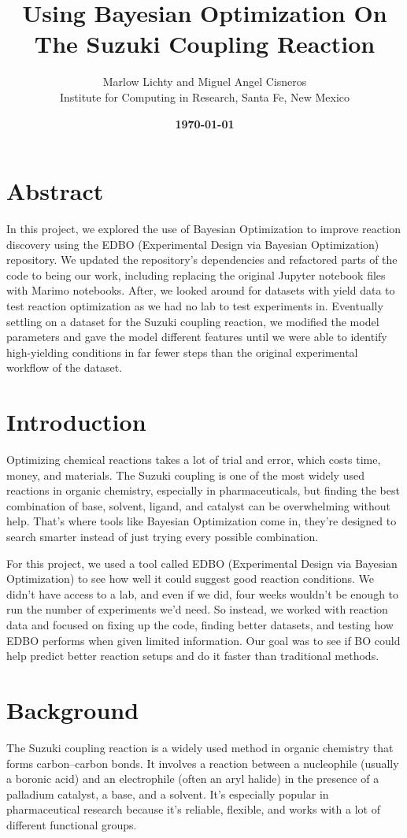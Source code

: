 \documentclass[12pt]{article}
\title{\textbf{Using Bayesian Optimization On The Suzuki Coupling Reaction}}
\author{Marlow Lichty and Miguel Angel Cisneros\\
Institute for Computing in Research, Santa Fe, New Mexico}
\date{\color{myblue}\bfseries\today}
\begin{document}
\maketitle

\section{Abstract}

In this project, we explored the use of Bayesian Optimization to improve reaction discovery using the EDBO (Experimental Design via Bayesian Optimization) repository. We updated the repository’s dependencies and refactored parts of the code to being our work, including replacing the original Jupyter notebook files with Marimo notebooks. After, we looked around for datasets with yield data to test reaction optimization as we had no lab to test experiments in. Eventually settling on a dataset for the Suzuki coupling reaction, we modified the model parameters and gave the model different features until we were able to identify high-yielding conditions in far fewer steps than the original experimental workflow of the dataset. 

\section{Introduction}
Optimizing chemical reactions takes a lot of trial and error, which costs time, money, and materials. The Suzuki coupling is one of the most widely used reactions in organic chemistry, especially in pharmaceuticals, but finding the best combination of base, solvent, ligand, and catalyst can be overwhelming without help. That’s where tools like Bayesian Optimization come in, they’re designed to search smarter instead of just trying every possible combination.

For this project, we used a tool called EDBO (Experimental Design via Bayesian Optimization) to see how well it could suggest good reaction conditions. We didn’t have access to a lab, and even if we did, four weeks wouldn’t be enough to run the number of experiments we’d need. So instead, we worked with reaction data and focused on fixing up the code, finding better datasets, and testing how EDBO performs when given limited information. Our goal was to see if BO could help predict better reaction setups and do it faster than traditional methods.

\section{Background}
The Suzuki coupling reaction is a widely used method in organic chemistry that forms carbon–carbon bonds. It involves a reaction between a nucleophile (usually a boronic acid) and an electrophile (often an aryl halide) in the presence of a palladium catalyst, a base, and a solvent. It’s especially popular in pharmaceutical research because it’s reliable, flexible, and works with a lot of different functional groups.
\end{document}
